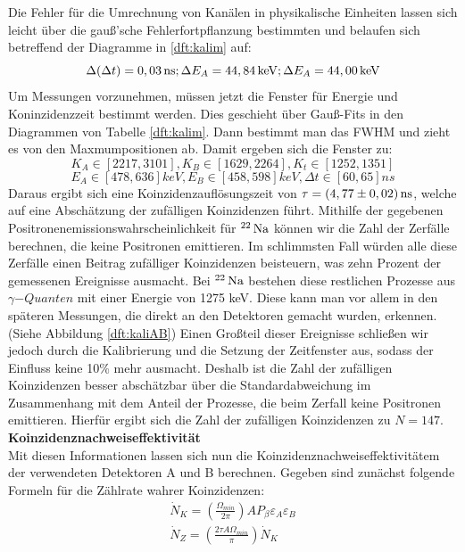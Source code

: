        Die Fehler für die Umrechnung von Kanälen in physikalische Einheiten lassen sich leicht über die gauß'sche Fehlerfortpflanzung bestimmten und belaufen sich betreffend 
       der Diagramme in \ref{dft:kalim} auf:\\
       $$ \Delta(\Delta t) = \unit[0,03]{ns} ; \Delta E_A = \unit[44,84]{keV}; \Delta E_A = \unit[44,00]{keV} $$
       Um Messungen vorzunehmen, müssen jetzt die Fenster für Energie und Koninzidenzzeit bestimmt werden. Dies geschieht über Gauß-Fits in den Diagrammen von Tabelle \ref{dft:kalim}.
       Dann bestimmt man das FWHM und zieht es von den Maxmumpositionen ab. Damit ergeben sich die Fenster zu:
       $$ K_A \in \left[ 2217, 3101\right], K_B \in \left[ 1629, 2264 \right],  K_t \in \left[1252, 1351\right] $$ 
       $$ E_A \in \left[478 , 636\right] \unit{keV}, E_B \in \left[ 458, 598\right] \unit{keV},  \Delta t \in \left[60, 65\right]\unit{ns} $$ 
       Daraus ergibt sich eine Koinzidenzauflösungszeit von $\tau = \unit[(4,77 \pm 0,02)]{ns}$, welche auf eine Abschätzung der zufälligen Koinzidenzen führt. Mithilfe der gegebenen Positronenemissionswahrscheinlichkeit
       für $\unit[^{22}]{Na}$ können wir die Zahl der Zerfälle berechnen, die keine Positronen emittieren. Im schlimmsten Fall würden alle diese Zerfälle einen Beitrag zufälliger Koinzidenzen beisteuern, was 
       zehn Prozent der gemessenen Ereignisse ausmacht. Bei $\unit[^{22}]{Na}$ bestehen diese restlichen Prozesse aus $\gamma\unit{-Quanten}$ mit einer Energie von 1275 keV. Diese kann man vor allem in den späteren
       Messungen, die direkt an den Detektoren gemacht wurden, erkennen. (Siehe Abbildung \ref{dft:kaliAB}) Einen Großteil dieser Ereignisse schließen wir jedoch durch die Kalibrierung und die Setzung der Zeitfenster
       aus, sodass der Einfluss keine 10\% mehr ausmacht. Deshalb ist die Zahl der zufälligen Koinzidenzen besser abschätzbar über die Standardabweichung im Zusammenhang mit dem Anteil der Prozesse, die beim Zerfall 
       keine Positronen emittieren. Hierfür ergibt sich die Zahl der zufälligen Koinzidenzen zu $N = 147$.\\
       
       \textbf{Koinzidenznachweiseffektivität}\\
       Mit diesen Informationen lassen sich nun die Koinzidenznachweiseffektivitätem der verwendeten Detektoren A und B berechnen. Gegeben sind zunächst folgende Formeln für die Zählrate wahrer Koinzidenzen:
       \begin{gather}
           \dot N_K = \left( \frac{\Omega _{min}}{2\pi} \right) A P_\beta \varepsilon_A \varepsilon_B
           \label{dff:NK}\\
           \dot N_Z = \left( \frac{2\tau A\Omega _{min}}{\pi} \right)\dot N_K
           \label{dff:NZ}
       \end{gather}
       
